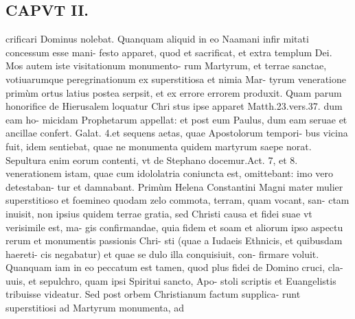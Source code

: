 \documentclass{article}
\begin{document}
\begin{pages}
\section*{CAPVT II. }
\marginpar{[ p.69 ]}\pstart crificari Dominus nolebat. Quanquam aliquid in eo Naamani infir mitati concessum esse mani- festo apparet, quod et sacrificat, et extra templum Dei. Mos autem iste visitationum monumento- rum Martyrum, et terrae sanctae, votiuarumque peregrinationum ex superstitiosa et nimia Mar- tyrum veneratione primùm ortus latius postea serpsit, et ex errore errorem produxit. Quam parum honorifice de Hierusalem loquatur Chri stus ipse apparet Matth.23.vers.37. dum eam ho- micidam Prophetarum appellat: et post eum Paulus, dum eam seruae et ancillae confert. Galat. 4.et sequens aetas, quae Apostolorum tempori- bus vicina fuit, idem sentiebat, quae ne monumenta quidem martyrum saepe norat. Sepultura enim eorum contenti, vt de Stephano docemur.Act. 7, et 8. venerationem istam, quae cum idololatria coniuncta est, omittebant: imo vero detestaban- tur et damnabant. Primùm Helena Constantini Magni mater mulier superstitioso et foemineo quodam zelo commota, terram, quam vocant, san- ctam inuisit, non ipsius quidem terrae gratia, sed Christi causa et fidei suae vt verisimile est, ma- gis confirmandae, quia fidem et soam et aliorum ipso aspectu rerum et monumentis passionis Chri- sti (quae a Iudaeis Ethnicis, et quibusdam haereti- cis negabatur) et quae se dulo illa conquisiuit, con- firmare voluit. Quanquam iam in eo peccatum est tamen, quod plus fidei de Domino cruci, cla- uuis, et sepulchro, quam ipsi Spiritui sancto, Apo- stoli scriptis et Euangelistis tribuisse videatur. Sed post orbem Christianum factum supplica- runt superstitiosi ad Martyrum monumenta, ad  \pend

\end{pages}
\end{document}
